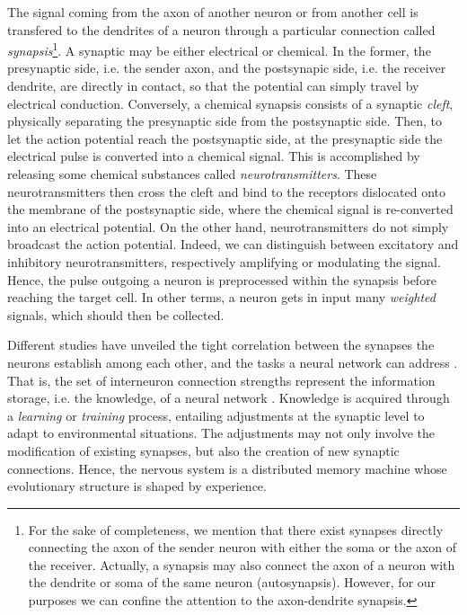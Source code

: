 \documentclass[11pt, a4paper]{report}
\numberwithin{equation}{chapter}
\theoremstyle{theorem}
\theoremstyle{definition}
\numberwithin{figure}{section}
\begin{document}
		The signal coming from the axon of another neuron or from another cell is transfered to the dendrites of a neuron through a particular connection called \emph{synapsis}\footnote{For the sake of completeness, we mention that there exist synapses directly connecting the axon of the sender neuron with either the soma or the axon of the receiver. Actually, a synapsis may also connect the axon of a neuron with the dendrite or soma of the same neuron (autosynapsis). However, for our purposes we can confine the attention to the axon-dendrite synapsis.}. A synaptic may be either electrical or chemical. In the former, the presynaptic side, i.e. the sender axon, and the postsynapic side, i.e. the receiver dendrite, are directly in contact, so that the potential can simply travel by electrical conduction. Conversely, a chemical synapsis consists of a synaptic \emph{cleft}, physically separating the presynaptic side from the postsynaptic side. Then, to let the action potential reach the postsynaptic side, at the presynaptic side the electrical pulse is converted into a chemical signal. This is accomplished by releasing some chemical substances called \emph{neurotransmitters}. These neurotransmitters then cross the cleft and bind to the receptors dislocated onto the membrane of the postsynaptic side, where the chemical signal is re-converted into an electrical potential. On the other hand, neurotransmitters do not simply broadcast the action potential. Indeed, we can distinguish between excitatory and inhibitory neurotransmitters, respectively amplifying or modulating the signal. Hence, the pulse outgoing a neuron is preprocessed within the synapsis before reaching the target cell. In other terms, a neuron gets in input many \emph{weighted} signals, which should then be collected.
		
		 Different studies have unveiled the tight correlation between the synapses the neurons establish among each other, and the tasks a neural network can address \cite{Hag14}. That is, the set of interneuron connection strengths represent the information storage, i.e. the knowledge, of a neural network \cite{Kri}. Knowledge is acquired through a \emph{learning} or \emph{training} process, entailing adjustments at the synaptic level to adapt to environmental situations. The adjustments may not only involve the modification of existing synapses, but also the creation of new synaptic connections. Hence, the nervous system is a distributed memory machine whose evolutionary structure is shaped by experience.
		 
\end{document}
